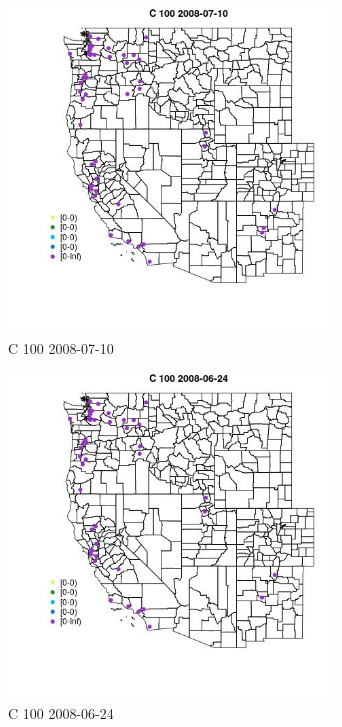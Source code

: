 \begin{figure} 
\centering  
\includegraphics[width=0.77\textwidth]{Code_Outputs/Report_ML_input_PM25_Step4_part_e_de_duplicated_aves_MapObsC_1002008-07-10.jpg} 
\caption{\label{fig:Report_ML_input_PM25_Step4_part_e_de_duplicated_avesMapObsC_1002008-07-10}C 100 2008-07-10} 
\end{figure} 
 

\begin{figure} 
\centering  
\includegraphics[width=0.77\textwidth]{Code_Outputs/Report_ML_input_PM25_Step4_part_e_de_duplicated_aves_MapObsC_1002008-06-24.jpg} 
\caption{\label{fig:Report_ML_input_PM25_Step4_part_e_de_duplicated_avesMapObsC_1002008-06-24}C 100 2008-06-24} 
\end{figure} 
 

